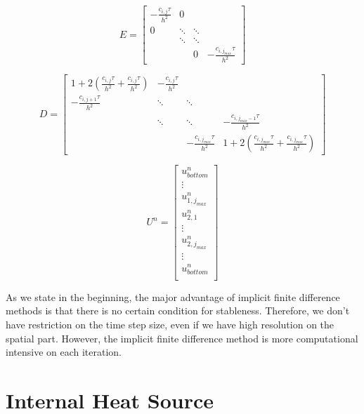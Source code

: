 \documentclass[10pt,a4paper]{report}
\begin{document}
\[E=\begin{bmatrix}
-{\frac{c_{i,j}\tau}{h^2}} & 0 & & \\
0 & \ddots & \ddots & \\
  & \ddots & \ddots & \\
  &        & 0 & -{\frac{c_{i,j_{max}}\tau}{h^2}}  
\end{bmatrix}
\]

\[D=\begin{bmatrix}
1+2({\frac{c_{i,j}\tau}{h^2}}+{\frac{c_{i,j}\tau}{h^2}}) & -{\frac{c_{i,j}\tau}{h^2}} & &  \\
-{\frac{c_{i,j+1}\tau}{h^2}} & \ddots & \ddots & \\
& \ddots & \ddots & -{\frac{c_{i,j_{max}-1}\tau}{h^2}}\\
 &  & -{\frac{c_{i,j_{max}}\tau}{h^2}} & 1+2({\frac{c_{i,j_{max}}\tau}{h^2}}+{\frac{c_{i,j_{max}}\tau}{h^2}})
\end{bmatrix}
\]

\[U^{n}=\begin{bmatrix}
u^{n}_{bottom}\\
\vdots\\
u^{n}_{1,j_{max}}\\
u^{n}_{2,1}\\
\vdots\\
u^{n}_{2,j_{max}}\\
\vdots\\
u^{n}_{bottom}\\
\end{bmatrix}
\]


As we state in the beginning, the major advantage of implicit finite difference methods is that there is no certain condition for stableness. Therefore, we don't have restriction on the time step size, even if we have high resolution on the spatial part. However, the implicit finite difference method is more computational intensive on each iteration.

\section{Internal Heat Source}
\end{document}
